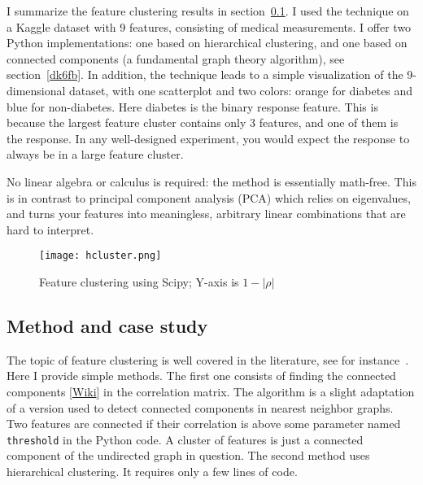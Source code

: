 \documentclass[oneside,10pt]{book}
\begin{document}
 I summarize the feature clustering results in section~\ref{ioude}.
 I used the technique on a Kaggle dataset with 9 features, consisting of medical measurements. I offer two Python
 implementations: one based on hierarchical clustering, and one based on connected components (a 
 fundamental graph theory
 algorithm), see section~\ref{dk6fb}. In addition, the
 technique leads to a simple visualization of the 9-dimensional dataset, with one scatterplot and two colors: orange for diabetes 
 and blue for non-diabetes. Here diabetes is the binary response feature. 
This is because the largest feature cluster  contains only 3 
 features, and one of them is the response. In any well-designed experiment, you would expect the response to always be in
 a large feature cluster.

No linear algebra or calculus is required: the method is essentially math-free. This is in contrast to principal component analysis (PCA) which
 relies on eigenvalues, and turns your features into meaningless, arbitrary linear combinations that are hard to interpret.

\begin{figure}[H]
\centering
\texttt{[image: hcluster.png]}  
\caption{Feature clustering using Scipy; Y-axis is $1-|\rho|$}
\label{fig:picbhggg2xspp}
\end{figure}

\subsection{Method and case study}\label{ioude}


The topic of \textcolor{index}{feature clustering} is well covered in the literature, see for instance~\cite{fcnice}.  Here I provide simple methods. The first one  consists of finding the \textcolor{index}{connected components} 
 [\href{https://en.wikipedia.org/wiki/Component_(graph_theory)}{Wiki}] in the correlation matrix. The algorithm is a slight adaptation of a version used to detect
 connected components in nearest neighbor graphs. 
 Two features are connected if their correlation is above some parameter named \texttt{threshold} in the Python code.  A cluster of features is just a connected component of the 
 \textcolor{index}{undirected graph} in question. The second method uses 
\textcolor{index}{hierarchical clustering}. It requires only a few lines of code.  
\end{document}
